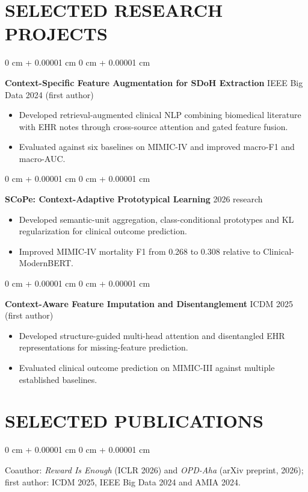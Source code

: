 \documentclass[10pt, letterpaper]{article}
\newenvironment{highlights}{
    \begin{itemize}[
        topsep=0.03 cm,
        parsep=0.03 cm,
        partopsep=0pt,
        itemsep=0pt,
        leftmargin=0 cm + 10pt
    ]
}{
    \end{itemize}
} %
\newenvironment{onecolentry}{
    \begin{adjustwidth}{
        0 cm + 0.00001 cm
    }{
        0 cm + 0.00001 cm
    }
}{
    \end{adjustwidth}
} %
\begin{document}
\section{SELECTED RESEARCH PROJECTS}
\begin{onecolentry}
\textbf{Context-Specific Feature Augmentation for SDoH Extraction} \hfill IEEE Big Data 2024 (first author)
\begin{highlights}
\item Developed retrieval-augmented clinical NLP combining biomedical literature with EHR notes through cross-source attention and gated feature fusion.
\item Evaluated against six baselines on MIMIC-IV and improved macro-F1 and macro-AUC.
\end{highlights}
\end{onecolentry}
\vspace{0.025 cm}
\begin{onecolentry}
\textbf{SCoPe: Context-Adaptive Prototypical Learning} \hfill 2026 research
\begin{highlights}
\item Developed semantic-unit aggregation, class-conditional prototypes and KL regularization for clinical outcome prediction.
\item Improved MIMIC-IV mortality F1 from 0.268 to 0.308 relative to Clinical-ModernBERT.
\end{highlights}
\end{onecolentry}
\vspace{0.025 cm}
\begin{onecolentry}
\textbf{Context-Aware Feature Imputation and Disentanglement} \hfill ICDM 2025 (first author)
\begin{highlights}
\item Developed structure-guided multi-head attention and disentangled EHR representations for missing-feature prediction.
\item Evaluated clinical outcome prediction on MIMIC-III against multiple established baselines.
\end{highlights}
\end{onecolentry}
\vspace{0.025 cm}
\section{SELECTED PUBLICATIONS}
\begin{onecolentry}
Coauthor: \textit{Reward Is Enough} (ICLR 2026) and \textit{OPD-Aha} (arXiv preprint, 2026); first author: ICDM 2025, IEEE Big Data 2024 and AMIA 2024.
\end{onecolentry}
\end{document}
